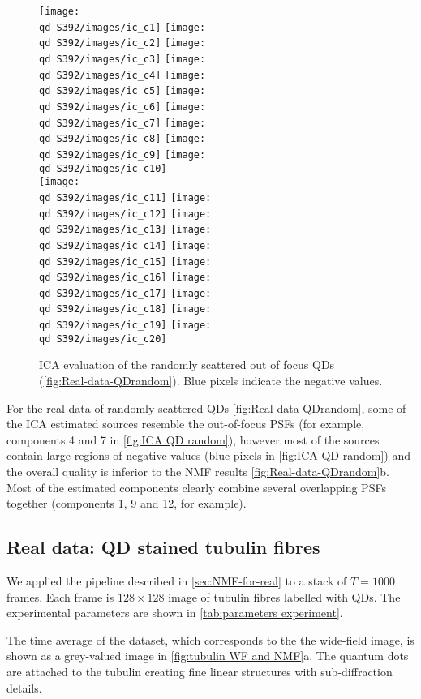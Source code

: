 \begin{figure}[htb]
	\newcommand{\wf}{.25}
	\newcommand{\barspace}{-.6cm}	
	\centering
	\texttt{[image: \\qd S392/images/ic\_c1]}
	\texttt{[image: \\qd S392/images/ic\_c2]}
	\texttt{[image: \\qd S392/images/ic\_c3]}
	\texttt{[image: \\qd S392/images/ic\_c4]}
	\texttt{[image: \\qd S392/images/ic\_c5]}
	\texttt{[image: \\qd S392/images/ic\_c6]}
	\texttt{[image: \\qd S392/images/ic\_c7]}
	\texttt{[image: \\qd S392/images/ic\_c8]}
	\texttt{[image: \\qd S392/images/ic\_c9]}
	\texttt{[image: \\qd S392/images/ic\_c10]}\\
	\texttt{[image: \\qd S392/images/ic\_c11]}
	\texttt{[image: \\qd S392/images/ic\_c12]}
	\texttt{[image: \\qd S392/images/ic\_c13]}
	\texttt{[image: \\qd S392/images/ic\_c14]}
	\texttt{[image: \\qd S392/images/ic\_c15]}
	\texttt{[image: \\qd S392/images/ic\_c16]}
	\texttt{[image: \\qd S392/images/ic\_c17]}
	\texttt{[image: \\qd S392/images/ic\_c18]}
	\texttt{[image: \\qd S392/images/ic\_c19]}
	\texttt{[image: \\qd S392/images/ic\_c20]}
	\caption{ICA evaluation of the randomly scattered out of focus QDs (\autoref{fig:Real-data-QDrandom}). Blue pixels indicate the negative values.}
	\label{fig:ICA QD random}
\end{figure}
%
For the real data of randomly scattered QDs \autoref{fig:Real-data-QDrandom}, some of the ICA estimated sources resemble the out-of-focus PSFs (for example, components 4 and 7 in \autoref{fig:ICA QD random}), however most of the sources contain large regions of negative values (blue pixels in \autoref{fig:ICA QD random}) and the overall quality is inferior to the NMF results \autoref{fig:Real-data-QDrandom}b. Most of the estimated components clearly combine several overlapping PSFs together (components 1, 9 and 12, for example). 
\clearpage
\subsection{Real data: QD stained tubulin fibres\label{sub:results - tubulin}}
We applied the pipeline described in \autoref{sec:NMF-for-real} to a stack of $T=1000$ frames. Each frame is $128\times128$ image of tubulin fibres labelled with QDs. The experimental parameters are shown in \autoref{tab:parameters experiment}.

The time average of the dataset, which corresponds to the the wide-field image, is shown as a grey-valued image in \autoref{fig:tubulin WF and NMF}a. The quantum dots are attached to the tubulin creating fine linear structures with sub-diffraction details. 

